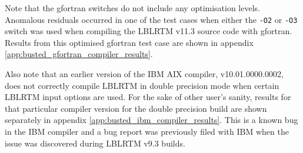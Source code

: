 Note that the gfortran switches do not include any optimisation levels. Anomalous residuals occurred in one of the test cases when either the \texttt{-O2} or \texttt{-O3} switch was used when compiling the LBLRTM v11.3 source code with gfortran. Results from this optimised gfortran test case are shown in appendix \ref{app:busted_gfortran_compiler_results}.

Also note that an earlier version of the IBM AIX compiler, v10.01.0000.0002, does not correctly compile LBLRTM in double precision mode when certain LBLRTM input options are used. For the sake of other user's sanity, results for that particular compiler version for the double precision build are shown separately in appendix \ref{app:busted_ibm_compiler_results}. This is a known bug in the IBM compiler and a bug report was previously filed with IBM when the issue was discovered during LBLRTM v9.3 builds.


